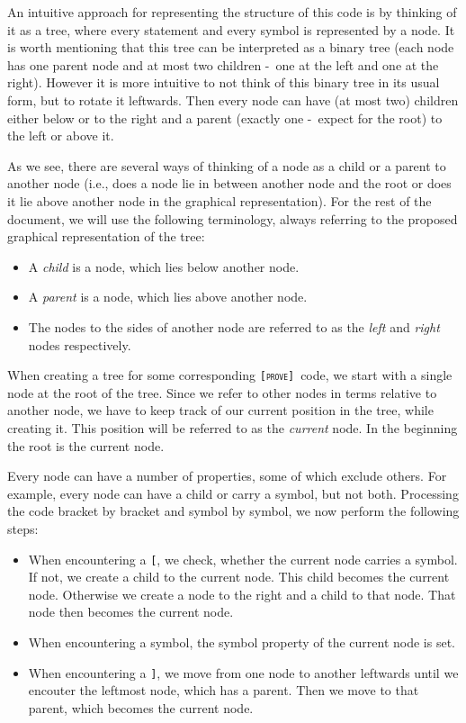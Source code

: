 \documentclass[british]{article}
\newcommand\prv{bc}
\newcommand\m[1]{\texttt{#1}}
\newcommand\name{\texttt{\textsc{[prove]}}}
\begin{document}
An intuitive approach for representing the structure of this code
is by thinking of it as a tree, where every statement and every symbol is represented by a node. It is worth mentioning that this tree can be interpreted as a binary tree (each node has one parent node and at most two children -\ one at the left and one at the right). However it is more intuitive to not think of this binary tree in its usual form, but to rotate it leftwards. Then every node can have (at most two) children either below or to the right and a parent (exactly one -\ expect for the root) to the left or above it.

As we see, there are several ways of thinking of a node as a child or a parent to another node (i.e., does a node lie in between another node and the root or does it lie above another node in the graphical representation). For the rest of the document, we will use the following terminology, always referring to the proposed graphical representation of the tree:

\begin{itemize}
	\item
		A \emph{child} is a node, which lies below another node.
	\item
		A \emph{parent} is a node, which lies above another node.
	\item
		The nodes to the sides of another node are referred to as the \emph{left} and \emph{right} nodes respectively.
\end{itemize}

When creating a tree for some corresponding \name\ code, we start with a single node at the root of the tree. Since we refer to other nodes in terms relative to another node, we have to keep track of our current position in the tree, while creating it. This position will be referred to as the \emph{current} node. In the beginning the root is the current node.

Every node can have a number of properties, some of which exclude others. For example, every node can have a child or carry a symbol, but not both. Processing the code bracket by bracket and symbol by symbol, we now perform the following steps:

\begin{itemize}
	\item When encountering a \m{[}, we check, whether the current node carries a symbol. If not, we create a child to the current node. This child becomes the current node. Otherwise we create a node to the right and a child to that node. That node then becomes the current node.
	\item When encountering a symbol, the symbol property of the current node is set.
	\item When encountering a \m{]}, we move from one node to another leftwards until we encouter the leftmost node, which has a parent. Then we move to that parent, which becomes the current node.
\end{itemize}
\end{document}
